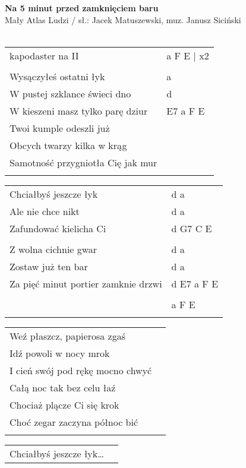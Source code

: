 \documentclass[a5paper]{article}
\begin{document}


\noindent
\fontsize{12pt}{15pt}\selectfont
\textbf{Na 5 minut przed zamknięciem baru} \\
\fontsize{8pt}{10pt}\selectfont
Mały Atlas Ludzi / sł.: Jacek Matuszewski, muz. Janusz Siciński \\ \\
\fontsize{10pt}{12pt}\selectfont
{}
\begin{tabular}{@{}p{8.00cm}p{3cm}@{}}
\noindent
kapodaster na II & a F E | x2\\ \\
Wysączyłeś ostatni łyk & a \\
W pustej szklance świeci dno & d \\
W kieszeni masz tylko parę dziur & E7 a F E \\
Twoi kumple odeszli już \\
Obcych twarzy kilka w krąg \\
Samotność przygniotła Cię jak mur \\ \\
\end{tabular}

\noindent
\begin{tabular}{@{}p{7.00cm}p{3cm}@{}}
Chciałbyś jeszcze łyk & d a \\
Ale nie chce nikt & d a \\
Zafundować kielicha Ci & d G7 C E \\ \\
Z wolna cichnie gwar & d a\\
Zostaw już ten bar & d a\\
Za pięć minut portier zamknie drzwi & d E7 a F E \\ \\
& a F E \\ \\
\end{tabular}

\noindent
\begin{tabular}{@{}p{7.00cm}p{3cm}@{}}
Weź płaszcz, papierosa zgaś \\
Idź powoli w nocy mrok \\
I cień swój pod rękę mocno chwyć\\
Całą noc tak bez celu łaź\\
Chociaż plącze Ci się krok\\
Choć zegar zaczyna północ bić\\\\
\end{tabular}

\noindent
\begin{tabular}{@{}p{7.00cm}p{3cm}@{}}
Chciałbyś jeszcze łyk…
\end{tabular}
\end{document}
